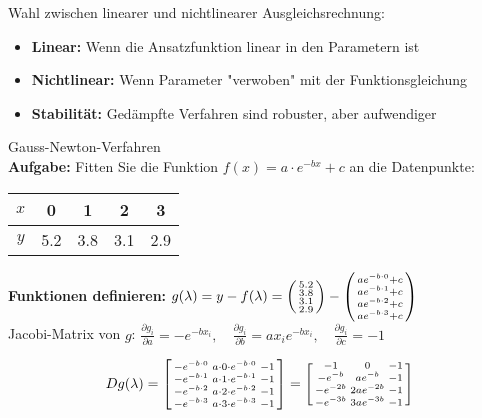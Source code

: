 \begin{theorem}{Wahl zwischen linearer und nichtlinearer Ausgleichsrechnung:}
\begin{itemize}
    \item \textbf{Linear:} Wenn die Ansatzfunktion linear in den Parametern ist
    \item \textbf{Nichtlinear:} Wenn Parameter "verwoben" mit der Funktionsgleichung
    \item \textbf{Stabilität:} Gedämpfte Verfahren sind robuster, aber aufwendiger
\end{itemize}
\end{theorem}

\begin{example2}{Gauss-Newton-Verfahren}\\
\textbf{Aufgabe:} Fitten Sie die Funktion $f(x) = a \cdot e^{-bx} + c$ an die Datenpunkte:

\begin{center}
\begin{tabular}{|c|c|c|c|c|}
\hline
$x$ & 0 & 1 & 2 & 3 \\
\hline
$y$ & 5.2 & 3.8 & 3.1 & 2.9 \\
\hline
\end{tabular}
\end{center}

\textbf{Funktionen definieren:}
$g(\lambda) = y - f(\lambda) = \begin{psmallmatrix} 5.2 \\ 3.8 \\ 3.1 \\ 2.9 \end{psmallmatrix} - \begin{psmallmatrix} ae^{-b \cdot 0} + c \\ ae^{-b \cdot 1} + c \\ ae^{-b \cdot 2} + c \\ ae^{-b \cdot 3} + c \end{psmallmatrix}$
\vspace{2mm}\\
Jacobi-Matrix von $g$:
$\frac{\partial g_i}{\partial a} = -e^{-bx_i}, \quad \frac{\partial g_i}{\partial b} = ax_ie^{-bx_i}, \quad \frac{\partial g_i}{\partial c} = -1$

$$Dg(\lambda) = \begin{bsmallmatrix}
-e^{-b \cdot 0} & a \cdot 0 \cdot e^{-b \cdot 0} & -1 \\
-e^{-b \cdot 1} & a \cdot 1 \cdot e^{-b \cdot 1} & -1 \\
-e^{-b \cdot 2} & a \cdot 2 \cdot e^{-b \cdot 2} & -1 \\
-e^{-b \cdot 3} & a \cdot 3 \cdot e^{-b \cdot 3} & -1
\end{bsmallmatrix} = \begin{bsmallmatrix}
-1 & 0 & -1 \\
-e^{-b} & ae^{-b} & -1 \\
-e^{-2b} & 2ae^{-2b} & -1 \\
-e^{-3b} & 3ae^{-3b} & -1
\end{bsmallmatrix}$$


\end{example2}
